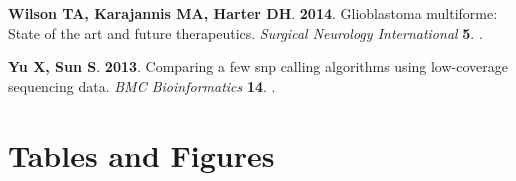 \documentclass[11 pt]{article} %
\begin{document}
\begin{thebibliography}{31}
\textbf{Wilson TA, Karajannis MA, Harter DH}. \textbf{2014}.
\newblock Glioblastoma multiforme: State of the art and future therapeutics.
\newblock \emph{Surgical Neurology International} \textbf{5}.
\newblock {}.

\textbf{Yu X, Sun S}. \textbf{2013}.
\newblock Comparing a few snp calling algorithms using low-coverage sequencing
  data.
\newblock \emph{BMC Bioinformatics} \textbf{14}.
\newblock {}.

\end{thebibliography}


\cleardoublepage
\section*{Tables and Figures}
\end{document}
